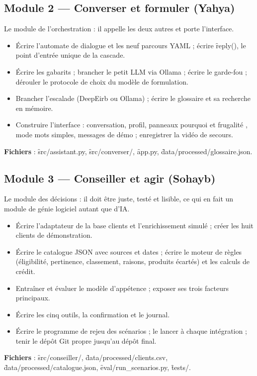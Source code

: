 \subsection{Module 2 --- Converser et formuler (Yahya)}

Le module de l'orchestration : il appelle les deux autres et porte l'interface.

\begin{itemize}
  \item Écrire l'automate de dialogue et les neuf parcours YAML ; écrire \f{reply()}, le point
        d'entrée unique de la cascade.
  \item Écrire les gabarits ; brancher le petit LLM via Ollama ; écrire le garde-fou ; dérouler le
        protocole de choix du modèle de formulation.
  \item Brancher l'escalade (DeepEirb ou Ollama) ; écrire le glossaire et sa recherche en mémoire.
  \item Construire l'interface : conversation, profil, panneaux \og pourquoi \fg{} et \og
        frugalité \fg, mode mots simples, messages de démo ; enregistrer la vidéo de secours.
\end{itemize}
\textbf{Fichiers} : \f{src/assistant.py}, \f{src/converser/}, \f{app.py},
\f{data/processed/glossaire.json}.

\subsection{Module 3 --- Conseiller et agir (Sohayb)}

Le module des décisions : il doit être juste, testé et lisible, ce qui en fait un module de génie
logiciel autant que d'IA.

\begin{itemize}
  \item Écrire l'adaptateur de la base clients et l'enrichissement simulé ; créer les huit clients
        de démonstration.
  \item Écrire le catalogue JSON avec sources et dates ; écrire le moteur de règles (éligibilité,
        pertinence, classement, raisons, produits écartés) et les calculs de crédit.
  \item Entraîner et évaluer le modèle d'appétence ; exposer ses trois facteurs principaux.
  \item Écrire les cinq outils, la confirmation et le journal.
  \item Écrire le programme de rejeu des scénarios ; le lancer à chaque intégration ; tenir le dépôt
        Git propre jusqu'au dépôt final.
\end{itemize}
\textbf{Fichiers} : \f{src/conseiller/}, \f{data/processed/clients.csv},
\f{data/processed/catalogue.json}, \f{eval/run\_scenarios.py}, \f{tests/}.

